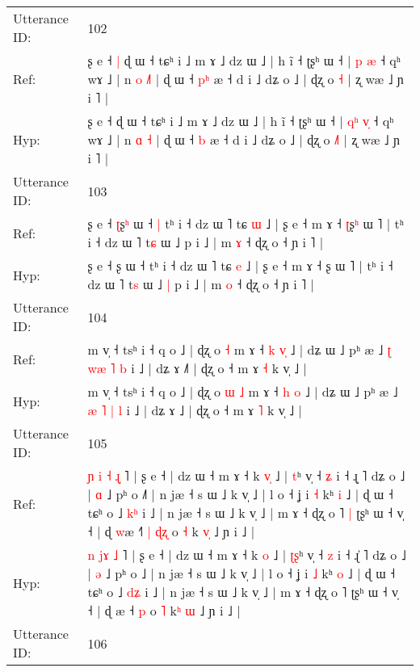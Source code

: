 \documentclass[10pt]{article}
\DeclareRobustCommand{\hl}[1]{{\textcolor{red}{#1}}}
\begin{document}
\begin{longtable}{ll}
 \\
\midrule
Utterance ID: & 102 \\
Ref: & ʂ e ˧\hl{ }\hl{|} ɖ ɯ ˧ tɕʰ i ˩ m ɤ ˩ dz ɯ ˩ | h ĩ ˧ ʈʂʰ ɯ ˧ | \hl{}\hl{p} \hl{}\hl{æ} ˧ qʰ wɤ ˩ | n \hl{o} \hl{˩}\hl{˥} | ɖ ɯ ˧ \hl{p}\hl{ʰ} æ ˧ d i ˩ dʑ o ˩ | ɖʐ o \hl{}\hl{˧} | ʐ wæ ˩ ɲ i ˥ |
 \\
Hyp: & ʂ e ˧\hl{}\hl{} ɖ ɯ ˧ tɕʰ i ˩ m ɤ ˩ dz ɯ ˩ | h ĩ ˧ ʈʂʰ ɯ ˧ | \hl{q}\hl{ʰ} \hl{v}\hl{̩} ˧ qʰ wɤ ˩ | n \hl{ɑ} \hl{}\hl{˧} | ɖ ɯ ˧ \hl{}\hl{b} æ ˧ d i ˩ dʑ o ˩ | ɖʐ o \hl{˩}\hl{˥} | ʐ wæ ˩ ɲ i ˥ |
 \\
\midrule
Utterance ID: & 103 \\
Ref: & ʂ e ˧ \hl{ʈ}ʂ\hl{ʰ} ɯ ˧\hl{ }\hl{|} tʰ i ˧ dz ɯ ˥ tɕ \hl{ɯ} ˩ | ʂ e ˧ m ɤ ˧ \hl{ʈ}ʂ\hl{ʰ} ɯ ˥ | tʰ i ˧ dz ɯ ˥ t\hl{ɕ} ɯ ˩\hl{}\hl{} p i ˩ | m \hl{ɤ} ˧ ɖʐ o ˧ ɲ i ˥ |
 \\
Hyp: & ʂ e ˧ \hl{}ʂ\hl{} ɯ ˧\hl{}\hl{} tʰ i ˧ dz ɯ ˥ tɕ \hl{e} ˩ | ʂ e ˧ m ɤ ˧ \hl{}ʂ\hl{} ɯ ˥ | tʰ i ˧ dz ɯ ˥ t\hl{s} ɯ ˩\hl{ }\hl{|} p i ˩ | m \hl{o} ˧ ɖʐ o ˧ ɲ i ˥ |
 \\
\midrule
Utterance ID: & 104 \\
Ref: & m v̩ ˧ tsʰ i ˧ q o ˩ | ɖʐ o\hl{}\hl{} \hl{˧} m ɤ ˧ \hl{k} \hl{v}\hl{̩} ˩ | dʑ ɯ ˩ pʰ æ ˩ \hl{ʈ} \hl{w}\hl{æ} \hl{˥} \hl{b} i ˩ | dʑ ɤ ˩\hl{˥} | ɖʐ o ˧ m ɤ \hl{˧} k v̩ ˩ |
 \\
Hyp: & m v̩ ˧ tsʰ i ˧ q o ˩ | ɖʐ o\hl{ }\hl{ɯ} \hl{˩} m ɤ ˧ \hl{h} \hl{}\hl{o} ˩ | dʑ ɯ ˩ pʰ æ ˩ \hl{æ} \hl{}\hl{˥} \hl{|} \hl{l} i ˩ | dʑ ɤ ˩\hl{} | ɖʐ o ˧ m ɤ \hl{˥} k v̩ ˩ |
 \\
\midrule
Utterance ID: & 105 \\
Ref: & \hl{ɲ} \hl{i}\hl{ }\hl{˧} \hl{ɻ}\hl{̩} ˥ | ʂ e ˧ | dz ɯ ˧ m ɤ ˧ k \hl{v}\hl{̩} ˩ | \hl{}\hl{t}ʰ v̩ ˧ \hl{ʑ} i ˧ ɻ\hl{̩} ˥ dʑ o ˩ | \hl{ɑ} ˩ pʰ o ˩\hl{˥} | n jæ ˧ s ɯ ˩ k v̩ ˩ | l o ˧ ʝ i \hl{˧} kʰ \hl{i} ˩ | ɖ ɯ ˧ tɕʰ o ˩ \hl{k}\hl{ʰ} i ˩ | n jæ ˧ s ɯ ˩ k v̩ ˩ | m ɤ ˧ ɖʐ o ˥\hl{ }\hl{|} ʈʂʰ ɯ ˧ v̩ ˧ | ɖ \hl{w}æ ˧\hl{˥}\hl{ }\hl{|} \hl{ɖ}\hl{ʐ} o \hl{˧} k\hl{ }\hl{v}\hl{̩} ˩ ɲ i ˩ |
 \\
Hyp: & \hl{n} \hl{}\hl{j}\hl{ɤ} \hl{}\hl{˩} ˥ | ʂ e ˧ | dz ɯ ˧ m ɤ ˧ k \hl{}\hl{o} ˩ | \hl{ʈ}\hl{ʂ}ʰ v̩ ˧ \hl{z} i ˧ ɻ\hl{̍} ˥ dʑ o ˩ | \hl{ə} ˩ pʰ o ˩\hl{} | n jæ ˧ s ɯ ˩ k v̩ ˩ | l o ˧ ʝ i \hl{˩} kʰ \hl{o} ˩ | ɖ ɯ ˧ tɕʰ o ˩ \hl{d}\hl{ʑ} i ˩ | n jæ ˧ s ɯ ˩ k v̩ ˩ | m ɤ ˧ ɖʐ o ˥\hl{}\hl{} ʈʂʰ ɯ ˧ v̩ ˧ | ɖ \hl{}æ ˧\hl{}\hl{}\hl{} \hl{}\hl{p} o \hl{˥} k\hl{ʰ}\hl{ }\hl{ɯ} ˩ ɲ i ˩ |
 \\
\midrule
Utterance ID: & 106 \\

\end{longtable}
\end{document}
